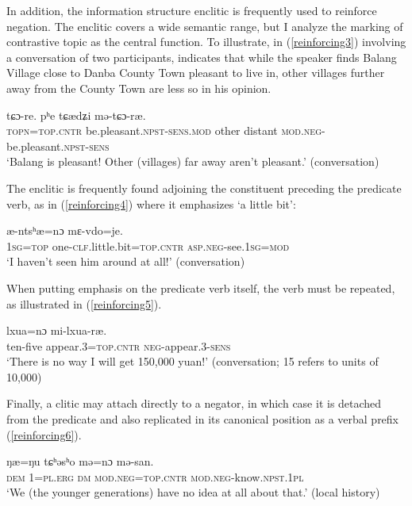 \documentclass[output=paper,colorlinks,citecolor=brown]{langscibook}
\begin{document}
In addition, the information structure enclitic  is frequently used to reinforce negation. The enclitic covers a wide semantic range, but I analyze the marking of contrastive topic as the central function. To illustrate, in (\ref{reinforcing3}) involving a conversation of two participants,  indicates that while the speaker finds Balang Village close to Danba County Town pleasant to live in, other villages further away from the County Town are less so in his opinion.

\ea
\label{reinforcing3}
 {tɕɔ-re}. {pʰe} {tɕædʑi} {mə-tɕɔ-ræ}.\\
    \textsc{topn=top.cntr} be.pleasant.\textsc{npst-sens.mod} other distant \textsc{mod.neg}-be.pleasant.\textsc{npst-sens}\\
\glt `Balang is pleasant! Other (villages) far away aren't pleasant.' (conversation)
\z

\noindent
The enclitic is frequently found adjoining the constituent preceding the predicate verb, as in (\ref{reinforcing4}) where it emphasizes  `a little bit':

\ea
\label{reinforcing4}
 		{æ-ntsʰæ=nɔ} 					{mɛ-vdo=je.}\\
	\textsc{1sg=top}	one-\textsc{clf}.little.bit=\textsc{top.cntr}	\textsc{asp.neg}-see.\textsc{1sg=mod}\\
\glt `I haven't seen him around at all!' (conversation)
\z

\noindent
When putting emphasis on the predicate verb itself, the verb must be repeated, as illustrated in (\ref{reinforcing5}).

\ea
\label{reinforcing5}
 {lxua=nɔ} {mi-lxua-ræ.}\\
    ten-five   appear.3=\textsc{top.cntr}	\textsc{neg}-appear.3\textsc{-sens}	\\
\glt `There is no way I will get 150,000 yuan!' (conversation; 15 refers to units of 10,000)
\z

\noindent
Finally, a clitic may attach directly to a negator, in which case it is detached from the predicate and also replicated in its canonical position as a verbal prefix (\ref{reinforcing6}).

\ea
\label{reinforcing6}
 	{ŋæ=ŋu} 	{tɕʰəsʰo} 	{mə=nɔ}		{mə-san.}\\
	\textsc{dem}    \textsc{1=pl.erg}   \textsc{dm}
	\textsc{mod.neg=top.cntr}  \textsc{mod.neg}-know.\textsc{npst.1pl}\\
\glt `We (the younger generations) have no idea at all about that.' (local history)
\z
\end{document}
